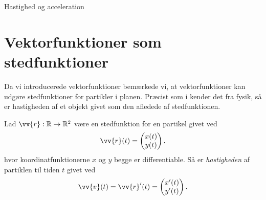 \begin{center}
	\Huge
	Hastighed og acceleration
\end{center}

\section*{Vektorfunktioner som stedfunktioner}

Da vi introducerede vektorfunktioner bemærkede vi, at vektorfunktioner kan udgøre stedfunktioner for partikler i planen. Præcist som i kender det fra fysik, så er hastigheden af et objekt givet som den afledede af stedfunktionen.
\begin{defn}[Hastighed]
	Lad $\vv{r}: \mathbb{R}\to \mathbb{R}^2$ være en stedfunktion for en partikel givet ved
	\begin{align*}
		\vv{r}(t) = 
		\begin{pmatrix}
			x(t) \\
			y(t)
		\end{pmatrix},
\end{align*}		
hvor koordinatfunktionerne $x$ og $y$ begge er differentiable. 
Så er \textit{hastigheden} af partiklen til tiden $t$ givet ved
\begin{align*}
	\vv{v}(t) =  \vv{r}'(t) = 
	\begin{pmatrix}
		x'(t) \\
		y'(t)
	\end{pmatrix}.
\end{align*}
\end{defn}

